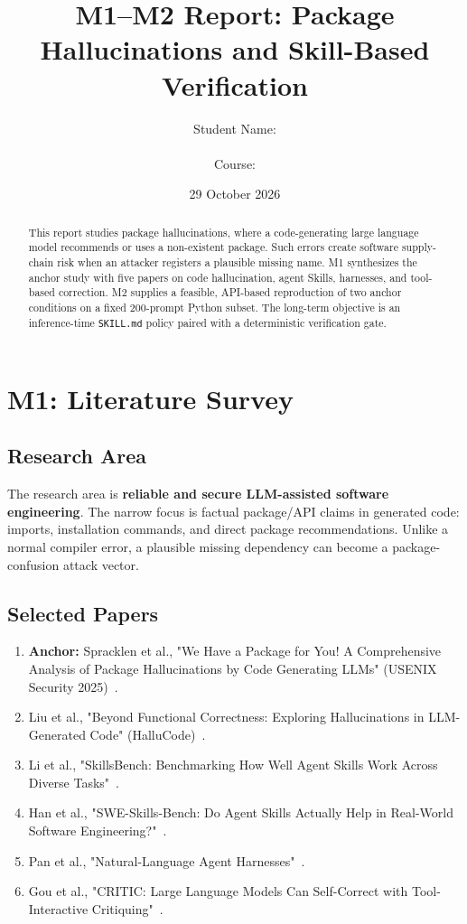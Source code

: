 \documentclass[11pt,a4paper]{article}
\title{\textbf{M1--M2 Report: Package Hallucinations and Skill-Based Verification}}
\author{Student Name: \rule{7cm}{0.4pt} \quad Course: \rule{4cm}{0.4pt}}
\date{29 October 2026}
\begin{document}
\maketitle
\begin{abstract}
This report studies package hallucinations, where a code-generating large language model recommends or uses a non-existent package. Such errors create software supply-chain risk when an attacker registers a plausible missing name. M1 synthesizes the anchor study with five papers on code hallucination, agent Skills, harnesses, and tool-based correction. M2 supplies a feasible, API-based reproduction of two anchor conditions on a fixed 200-prompt Python subset. The long-term objective is an inference-time \texttt{SKILL.md} policy paired with a deterministic verification gate.
\end{abstract}
\section{M1: Literature Survey}
\subsection{Research Area}
The research area is \textbf{reliable and secure LLM-assisted software engineering}. The narrow focus is factual package/API claims in generated code: imports, installation commands, and direct package recommendations. Unlike a normal compiler error, a plausible missing dependency can become a package-confusion attack vector.
\subsection{Selected Papers}
\begin{enumerate}
  \item \textbf{Anchor:} Spracklen et al., "We Have a Package for You! A Comprehensive Analysis of Package Hallucinations by Code Generating LLMs" (USENIX Security 2025)~\cite{spracklen}.
  \item Liu et al., "Beyond Functional Correctness: Exploring Hallucinations in LLM-Generated Code" (HalluCode)~\cite{liuhallucode}.
  \item Li et al., "SkillsBench: Benchmarking How Well Agent Skills Work Across Diverse Tasks"~\cite{skillsbench}.
  \item Han et al., "SWE-Skills-Bench: Do Agent Skills Actually Help in Real-World Software Engineering?"~\cite{sweskills}.
  \item Pan et al., "Natural-Language Agent Harnesses"~\cite{nlah}.
  \item Gou et al., "CRITIC: Large Language Models Can Self-Correct with Tool-Interactive Critiquing"~\cite{critic}.
\end{enumerate}
\end{document}
